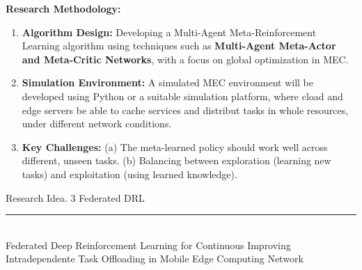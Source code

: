 \documentclass[12pt]{article}
\begin{document}
\vspace{5mm}

\noindent\textbf{\large Research Methodology:}

\begin{enumerate}  \item \textbf{Algorithm Design:} Developing a Multi-Agent Meta-Reinforcement Learning algorithm using techniques such as \textbf{Multi-Agent Meta-Actor and Meta-Critic Networks}, with a focus on global optimization in MEC.\vspace{-1mm}

\item \textbf{Simulation Environment:} A simulated MEC environment will be developed using Python or a suitable simulation platform, where cload and edge servers be able to cache services and distribut tasks in whole resources, under different network conditions. 
	
\item \textbf{Key Challenges:}  (a) The meta-learned policy should work well across different, unseen tasks. (b) Balancing between exploration (learning new tasks) and exploitation (using learned knowledge). 
\end{enumerate}


\newpage



\begin{center} 
	
	
	\vspace{-17mm}
	
	\large Research Idea. 3  \hfill Federated DRL \vspace{1mm} \hrule
	
	\vspace{-1mm}
	
	
	
	
	\textcolor{white}{i} \\ \LARGE Federated Deep Reinforcement Learning for Continuous Improving Intradependente Task Offloading in Mobile Edge Computing Network\vspace{6mm}\\
	
\end{center}
\vspace{-5mm}
\end{document}
